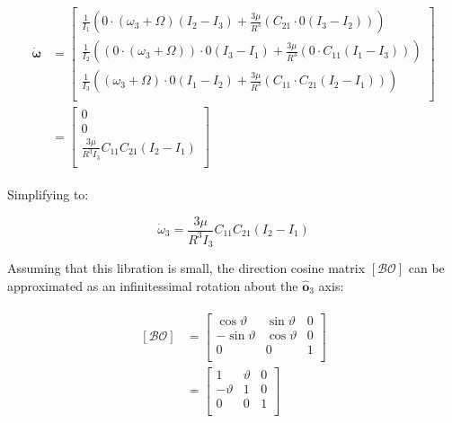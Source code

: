 \documentclass[
]{article}
\begin{document}
\[\begin{aligned}
\begin{aligned}
    \dot{\boldsymbol{\omega}} &= \begin{bmatrix}
        \frac{1}{I_1} \left(0 \cdot \left(\omega_3 + \Omega\right) \left(I_2 - I_3\right) + \frac{3 \mu}{R^3} \left(C_{21} \cdot 0 \left(I_3 - I_2\right)\right)\right) \\
        \frac{1}{I_2} \left(\left(0 \cdot \left(\omega_3 + \Omega\right)\right) \cdot 0 \left(I_3 - I_1\right) + \frac{3 \mu}{R^3} \left(0 \cdot C_{11} \left(I_1 - I_3\right)\right)\right) \\
        \frac{1}{I_3} \left(\left(\omega_3 + \Omega\right) \cdot 0 \left(I_1 - I_2\right) + \frac{3 \mu}{R^3} \left(C_{11} \cdot C_{21} \left(I_2 - I_1\right)\right)\right) \\
    \end{bmatrix} \\
    &= \begin{bmatrix}
        0 \\ 0 \\ \frac{3 \mu}{R^3 I_3} C_{11} C_{21} \left(I_2 - I_1\right) \\
    \end{bmatrix}
\end{aligned}
\end{aligned}\]

Simplifying to:

\[\dot{\omega}_3 = \frac{3 \mu}{R^3 I_3} C_{11} C_{21} \left(I_2 - I_1\right)\]

Assuming that this libration is small, the direction cosine matrix
\(\left[\mathcal{BO}\right]\) can be approximated as an infinitessimal
rotation about the \(\hat{\boldsymbol{o}}_3\) axis:

\[\begin{aligned}
\begin{aligned}
    \left[\mathcal{BO}\right] &= \begin{bmatrix}
        \cos\vartheta & \sin\vartheta & 0 \\
        -\sin\vartheta & \cos\vartheta & 0 \\
        0 & 0 & 1 \\
    \end{bmatrix} \\
    &= \begin{bmatrix}
        1 & \vartheta & 0 \\
        -\vartheta & 1 & 0 \\
        0 & 0 & 1 \\
    \end{bmatrix} \\
\end{aligned}
\end{aligned}\]
\end{document}

